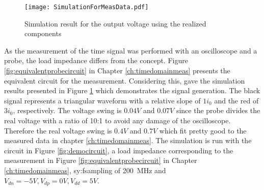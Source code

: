 \begin{figure}[htb!]
	\centering
  \texttt{[image: SimulationForMeasData.pdf]}
	\caption{Simulation result for the output voltage using the realized components}
	\label{fig:sim}
\end{figure}

As the measurement of the time signal was performed with an oscilloscope and a probe, the load impedance differs from the concept.
Figure \ref{fig:equivalentprobecircuit} in Chapter \ref{ch:timedomainmeas} presents the equivalent circuit for the measurement.
Considering this, gave the simulation results presented in Figure \ref{fig:sim} which demonstrates the signal generation.
The black signal represents a triangular waveform with a relative slope of $1 i_0$ and the red of $3 i_0$, respectively.
The voltage swing is $0.04 V$ and $0.07 V$ since the probe divides the real voltage with a ratio of 10:1 to avoid any damage of the oscilloscope.
Therefore the real voltage swing is $0.4 V$ and $0.7V$ which fit pretty good to the measured data in chapter \ref{ch:timedomainmeas}.
The simulation is run with the circuit in Figure \ref{fig:democircuit}, a load impedance corresponding to the measurement in Figure \ref{fig:equivalentprobecircuit} in Chapter \ref{ch:timedomainmeas}, \gls{sy:fsampling} of \SI{200}{\mega \hertz} and $V_{dn} = -5V, V_{dp} = 0V, V_{dd} = 5V$.



\newpage
